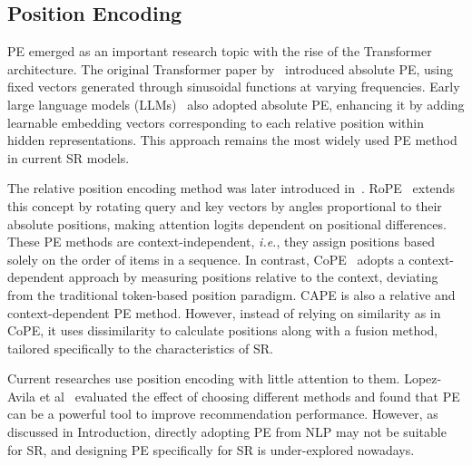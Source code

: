\subsection{Position Encoding} PE emerged as an important research topic with the rise of the Transformer architecture. The original Transformer paper by~\cite{10.5555/3295222.3295349} introduced absolute PE, using fixed vectors generated through sinusoidal functions at varying frequencies. Early large language models (LLMs)~\cite{Radford2018ImprovingLU} also adopted absolute PE, enhancing it by adding learnable embedding vectors corresponding to each relative position within hidden representations. This approach remains the most widely used PE method in current SR models.

The relative position encoding method was later introduced in~\cite{Shaw_Uszkoreit_Vaswani_2018}. RoPE~\cite{10.1016/j.neucom.2023.127063} extends this concept by rotating query and key vectors by angles proportional to their absolute positions, making attention logits dependent on positional differences. These PE methods are context-independent, \emph{i.e.}, they assign positions based solely on the order of items in a sequence. In contrast, CoPE~\cite{golovneva2024contextualpositionencodinglearning} adopts a context-dependent approach by measuring positions relative to the context, deviating from the traditional token-based position paradigm. CAPE is also a relative and context-dependent PE method. However, instead of relying on similarity as in CoPE, it uses dissimilarity to calculate positions along with a fusion method, tailored specifically to the characteristics of SR. 

Current researches use position encoding with little attention to them. Lopez-Avila et al~\cite{lopezavila2024positionalencodingcontextstudy} evaluated the effect of choosing different methods and found that PE can be a powerful tool to improve recommendation performance. However, as discussed in Introduction, directly adopting PE from NLP may not be suitable for SR, and designing PE specifically for SR is under-explored nowadays.